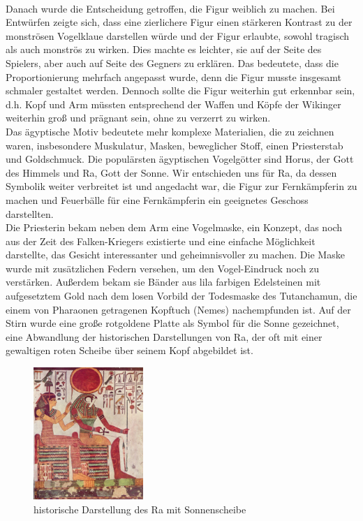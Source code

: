 \documentclass[extern,palatino]{cgBA}
\begin{document}
\\Danach wurde die Entscheidung getroffen, die Figur weiblich zu machen. Bei Entwürfen zeigte sich, dass eine zierlichere Figur einen stärkeren Kontrast zu der monströsen Vogelklaue darstellen würde und der Figur erlaubte, sowohl tragisch als auch monströs zu wirken. Dies machte es leichter, sie auf der Seite des Spielers, aber auch auf Seite des Gegners zu erklären. Das bedeutete, dass die Proportionierung mehrfach angepasst wurde, denn die Figur musste insgesamt schmaler gestaltet werden. Dennoch sollte die Figur weiterhin gut erkennbar sein, d.h. Kopf und Arm müssten entsprechend der Waffen und Köpfe der Wikinger weiterhin groß und prägnant sein, ohne zu verzerrt zu wirken. 
\\Das ägyptische Motiv bedeutete mehr komplexe Materialien, die zu zeichnen waren, insbesondere Muskulatur, Masken, beweglicher Stoff, einen Priesterstab und Goldschmuck. Die populärsten ägyptischen Vogelgötter sind Horus, der Gott des Himmels und Ra, Gott der Sonne. Wir entschieden uns für Ra, da dessen Symbolik weiter verbreitet ist und angedacht war, die Figur zur Fernkämpferin zu machen und Feuerbälle für eine Fernkämpferin ein geeignetes Geschoss darstellten.
\\Die Priesterin bekam neben dem Arm eine Vogelmaske, ein Konzept, das noch aus der Zeit des Falken-Kriegers existierte und eine einfache Möglichkeit darstellte, das Gesicht interessanter und geheimnisvoller zu machen. Die Maske wurde mit zusätzlichen Federn versehen, um den Vogel-Eindruck noch zu verstärken. Außerdem bekam sie Bänder aus lila farbigen Edelsteinen mit aufgesetztem Gold nach dem losen Vorbild der Todesmaske des Tutanchamun, die einem von Pharaonen getragenen Kopftuch (Nemes) nachempfunden ist. Auf der Stirn wurde eine große rotgoldene Platte als Symbol für die Sonne gezeichnet, eine Abwandlung der historischen Darstellungen von Ra, der oft mit einer gewaltigen roten Scheibe über seinem Kopf abgebildet ist.
\begin{figure}[H]
	\centering
	\includegraphics[height=5cm]{ra.jpg}
	\caption{historische Darstellung des Ra mit Sonnenscheibe}
	\label{ra}
\end{figure}
\end{document}
